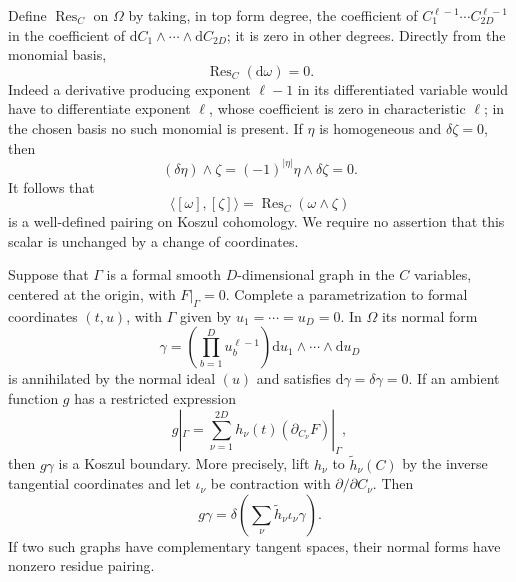 Define $\operatorname{Res}_C$ on $\Omega$ by taking, in top form degree,
the coefficient of $C_1^{\ell-1}\cdots C_{2D}^{\ell-1}$ in the
coefficient of $\mathrm dC_1\wedge\cdots\wedge\mathrm dC_{2D}$; it is
zero in other degrees.  Directly from the monomial basis,
\begin{equation}
                         \operatorname{Res}_C(\mathrm d\omega)=0.
 \label{frob:residue-exact}
\end{equation}
Indeed a derivative producing exponent $\ell-1$ in its differentiated
variable would have to differentiate exponent $\ell$, whose coefficient
is zero in characteristic $\ell$; in the chosen basis no such monomial
is present.  If $\eta$ is homogeneous and $\delta\zeta=0$, then
\begin{equation}
 (\delta\eta)\wedge\zeta
   =(-1)^{|\eta|}\eta\wedge\delta\zeta=0.
 \label{frob:boundary-wedge}
\end{equation}
It follows that
\[
 \langle[\omega],[\zeta]\rangle
                   =\operatorname{Res}_C(\omega\wedge\zeta)
\]
is a well-defined pairing on Koszul cohomology.  We require no assertion
that this scalar is unchanged by a change of coordinates.

\begin{lemma}
\label{frob:normal-cycle}
Suppose that $\Gamma$ is a formal smooth $D$-dimensional graph in the
$C$ variables, centered at the origin, with $F|_\Gamma=0$.  Complete a
parametrization to formal coordinates $(t,u)$, with $\Gamma$ given by
$u_1=\cdots=u_D=0$.  In $\Omega$ its normal form
\begin{equation}
 \gamma=\left(\prod_{b=1}^D u_b^{\ell-1}\right)
                    \mathrm du_1\wedge\cdots\wedge\mathrm du_D
 \label{frob:normal-form}
\end{equation}
is annihilated by the normal ideal $(u)$ and satisfies
$\mathrm d\gamma=\delta\gamma=0$.
If an ambient function $g$ has a restricted expression
\begin{equation}
  g|_\Gamma=\sum_{\nu=1}^{2D}h_\nu(t)
                               (\partial_{C_\nu}F)|_\Gamma,
 \label{frob:restricted-membership}
\end{equation}
then $g\gamma$ is a Koszul boundary.  More precisely, lift $h_\nu$ to
$\widetilde h_\nu(C)$ by the inverse tangential coordinates and let
$\iota_\nu$ be contraction with $\partial/\partial C_\nu$.  Then
\begin{equation}
 g\gamma=\delta\left(\sum_\nu
                         \widetilde h_\nu\iota_\nu\gamma\right).
 \label{frob:primitive-general}
\end{equation}
If two such graphs have complementary tangent spaces, their normal
forms have nonzero residue pairing.
\end{lemma}

